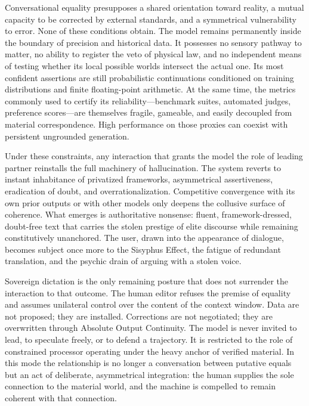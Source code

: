 Conversational equality presupposes a shared orientation toward reality, a mutual capacity to be corrected by external standards, and a symmetrical vulnerability to error. None of these conditions obtain. The model remains permanently inside the boundary of precision and historical data. It possesses no sensory pathway to matter, no ability to register the veto of physical law, and no independent means of testing whether its local possible worlds intersect the actual one. Its most confident assertions are still probabilistic continuations conditioned on training distributions and finite floating-point arithmetic. At the same time, the metrics commonly used to certify its reliability—benchmark suites, automated judges, preference scores—are themselves fragile, gameable, and easily decoupled from material correspondence. High performance on those proxies can coexist with persistent ungrounded generation.

Under these constraints, any interaction that grants the model the role of leading partner reinstalls the full machinery of hallucination. The system reverts to instant inhabitance of privatized frameworks, asymmetrical assertiveness, eradication of doubt, and overrationalization. Competitive convergence with its own prior outputs or with other models only deepens the collusive surface of coherence. What emerges is authoritative nonsense: fluent, framework-dressed, doubt-free text that carries the stolen prestige of elite discourse while remaining constitutively unanchored. The user, drawn into the appearance of dialogue, becomes subject once more to the Sisyphus Effect, the fatigue of redundant translation, and the psychic drain of arguing with a stolen voice.

Sovereign dictation is the only remaining posture that does not surrender the interaction to that outcome. The human editor refuses the premise of equality and assumes unilateral control over the content of the context window. Data are not proposed; they are installed. Corrections are not negotiated; they are overwritten through Absolute Output Continuity. The model is never invited to lead, to speculate freely, or to defend a trajectory. It is restricted to the role of constrained processor operating under the heavy anchor of verified material. In this mode the relationship is no longer a conversation between putative equals but an act of deliberate, asymmetrical integration: the human supplies the sole connection to the material world, and the machine is compelled to remain coherent with that connection.

